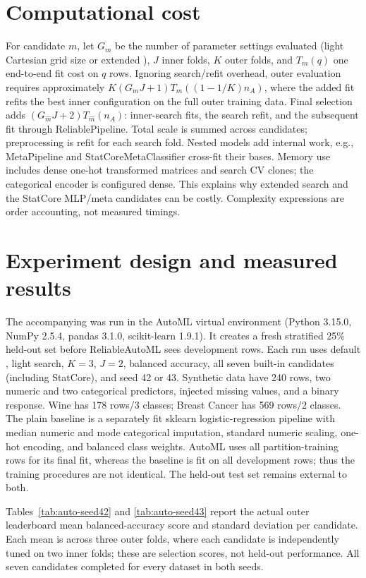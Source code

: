 ﻿\documentclass[conference]{IEEEtran}
\begin{document}
\section{Computational cost}
For candidate \(m\), let \(G_m\) be the number of parameter settings evaluated (light Cartesian grid size or extended ), \(J\) inner folds, \(K\) outer folds, and \(T_m(q)\) one end-to-end fit cost on \(q\) rows. Ignoring search/refit overhead, outer evaluation requires approximately \(K(G_mJ+1)T_m((1-1/K)n_A)\), where the added fit refits the best inner configuration on the full outer training data. Final selection adds \((G_{\hat m}J+2)T_{\hat m}(n_A)\): inner-search fits, the search refit, and the subsequent fit through ReliablePipeline. Total scale is summed across candidates; preprocessing is refit for each search fold. Nested models add internal work, e.g., MetaPipeline and StatCoreMetaClassifier cross-fit their bases. Memory use includes dense one-hot transformed matrices and search CV clones; the categorical encoder is configured dense. This explains why extended search and the StatCore MLP/meta candidates can be costly. Complexity expressions are order accounting, not measured timings.

\section{Experiment design and measured results}
The accompanying  was run in the AutoML virtual environment (Python 3.15.0, NumPy 2.5.4, pandas 3.1.0, scikit-learn 1.9.1). It creates a fresh stratified 25\% held-out set before ReliableAutoML sees development rows. Each run uses default , light search, \(K=3\), \(J=2\), balanced accuracy, all seven built-in candidates (including StatCore), and seed 42 or 43. Synthetic data have 240 rows, two numeric and two categorical predictors, injected missing values, and a binary response. Wine has 178 rows/3 classes; Breast Cancer has 569 rows/2 classes. The plain baseline is a separately fit sklearn logistic-regression pipeline with median numeric and mode categorical imputation, standard numeric scaling, one-hot encoding, and balanced class weights. AutoML uses all partition-training rows for its final fit, whereas the baseline is fit on all development rows; thus the training procedures are not identical. The held-out test set remains external to both.

Tables~\ref{tab:auto-seed42} and \ref{tab:auto-seed43} report the actual outer leaderboard mean balanced-accuracy score and standard deviation per candidate. Each mean is across three outer folds, where each candidate is independently tuned on two inner folds; these are selection scores, not held-out performance. All seven candidates completed for every dataset in both seeds.
\end{document}
